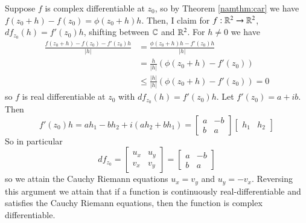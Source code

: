 Suppose $f$ is complex differentiable at $z_0$, so by Theorem \ref{namthm:car} we have $f(z_0+h) - f(z_0) = \phi(z_0+h)h$. Then, I claim for $f:\mathbb R^2\rightarrow \mathbb R^2$, $df_{z_0}(h) = f'(z_0)h$, shifting between $\mathbb C$ and $\mathbb R^2$. For $h \neq 0$ we have \begin{align*}
    \frac{f(z_0+h)-f(z_0) -f'(z_0)h}{|h|} &= \frac{\phi(z_0+h)h-f'(z_0)h}{|h|} \\
    &= \frac{h}{|h|}(\phi(z_0+h)-f'(z_0)) \\
    &\leq \frac{|h|}{|h|}(\phi(z_0+h)-f'(z_0)) = 0
\end{align*}
so $f$ is real differentiable at $z_0$ with $df_{z_0}(h) = f'(z_0)h$. Let $f'(z_0) = a+ib$. Then $$f'(z_0)h = ah_1-bh_2 + i(ah_2+bh_1) = \begin{bmatrix} a & -b \\ b & a \end{bmatrix}\begin{bmatrix} h_1 & h_2 \end{bmatrix}$$ So in particular $$df_{z_0} = \begin{bmatrix} u_x & u_y \\ v_x & v_y \end{bmatrix} = \begin{bmatrix} a & -b \\ b & a \end{bmatrix}$$ so we attain the Cauchy Riemann equations $u_x = v_y$ and $u_y = -v_x$. Reversing this argument we attain that if a function is continuously real-differentiable and satisfies the Cauchy Riemann equations, then the function is complex differentiable.



